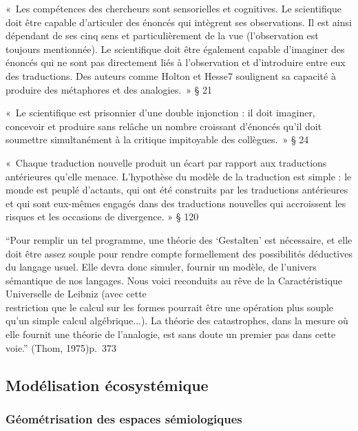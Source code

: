 \documentclass[
  letterpaper,
  DIV=11,
  numbers=noendperiod]{scrreprt}
\begin{document}
«~Les compétences des chercheurs sont sensorielles et cognitives. Le
scientifique doit être capable d'articuler des énoncés qui intègrent ses
observations. Il est ainsi dépendant de ses cinq sens et
particulièrement de la vue (l'observation est toujours mentionnée). Le
scientifique doit être également capable d'imaginer des énoncés qui ne
sont pas directement liés à l'observation et d'introduire entre eux des
traductions. Des auteurs comme Holton et Hesse7 soulignent sa capacité à
produire des métaphores et des analogies.~» § 21

«~Le scientifique est prisonnier d'une double injonction : il doit
imaginer, concevoir et produire sans relâche un nombre croissant
d'énoncés qu'il doit soumettre simultanément à la critique impitoyable
des collègues.~» § 24

«~Chaque traduction nouvelle produit un écart par rapport aux
traductions antérieures qu'elle menace. L'hypothèse du modèle de la
traduction est simple : le monde est peuplé d'actants, qui ont été
construits par les traductions antérieures et qui sont eux-mêmes engagés
dans des traductions nouvelles qui accroissent les risques et les
occasions de divergence. » § 120

``Pour remplir un tel programme, une théorie des `Gestalten' est
nécessaire, et elle doit être assez souple pour rendre compte
formellement des possibilités déductives du langage usuel. Elle devra
donc simuler, fournir un modèle, de l'univers sémantique de nos
langages. Nous voici reconduits au rêve de la Caractéristique
Universelle de Leibniz (avec cette\\
restriction que le calcul sur les formes pourrait être une opération
plus souple qu'un simple calcul algébrique...). La théorie des
catastrophes, dans la mesure où elle fournit une théorie de l'analogie,
est sans doute un premier pas dans cette voie.'' (Thom, 1975)p.~373

\hypertarget{moduxe9lisation-uxe9cosystuxe9mique}{%
\subsection{Modélisation
écosystémique}\label{moduxe9lisation-uxe9cosystuxe9mique}}

\hypertarget{guxe9omuxe9trisation-des-espaces-suxe9miologiques}{%
\subsubsection{Géométrisation des espaces
sémiologiques}\label{guxe9omuxe9trisation-des-espaces-suxe9miologiques}}
\end{document}
